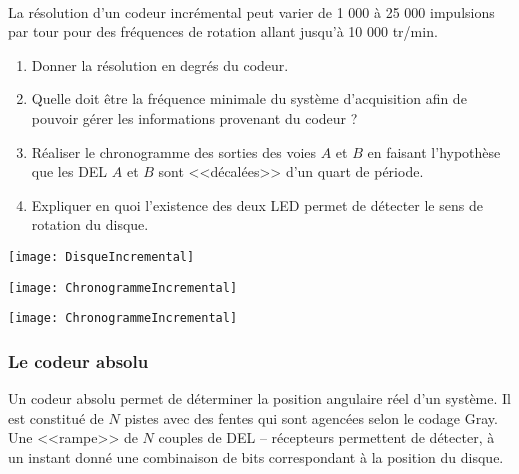 \begin{exemple} ~\\

\begin{minipage}[c]{.75\linewidth}

La résolution d'un codeur incrémental peut varier de 1 000 à 25 000 impulsions par tour pour des fréquences de rotation allant jusqu'à 10 000 tr/min.
\begin{enumerate}
\item Donner la résolution en degrés du codeur. 
\item Quelle doit être la fréquence minimale du système d'acquisition afin de pouvoir gérer les informations provenant du codeur ?
\item Réaliser le chronogramme des sorties des voies $A$ et $B$ en faisant l'hypothèse que les DEL $A$ et $B$ sont <<décalées>> d'un quart de période.
\item Expliquer en quoi l'existence des deux LED permet de détecter le sens de rotation du disque. 
\end{enumerate}
\end{minipage}\hfill
\begin{minipage}[c]{.2\linewidth}
\begin{center}
\texttt{[image: DisqueIncremental]}
\end{center}
\end{minipage}

\begin{minipage}[c]{.45\linewidth}
\begin{center}
\texttt{[image: ChronogrammeIncremental]}
\end{center}
\end{minipage} \hfill
\begin{minipage}[c]{.45\linewidth}
\begin{center}
\texttt{[image: ChronogrammeIncremental]}
\end{center}
\end{minipage}
\end{exemple}



\subsubsection{Le codeur absolu}

Un codeur absolu permet de déterminer la position angulaire réel d'un système. Il est constitué de $N$ pistes avec des fentes qui sont agencées selon le codage Gray. Une <<rampe>> de $N$ couples de DEL -- récepteurs permettent de détecter, à un instant donné une combinaison de bits correspondant à la position du disque. 

